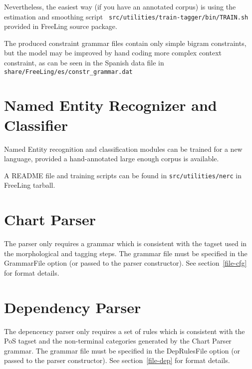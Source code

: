 \documentclass[a4paper]{book}
\begin{document}
   Nevertheless, the easiest way (if you have an annotated corpus) is
   using the estimation and smoothing script {\tt
   src/utilities/train-tagger/bin/TRAIN.sh} provided in FreeLing source package.  

   The produced constraint grammar files contain only simple bigram
   constraints, but the model may be improved by hand coding more
   complex context constraint, as can be seen in the Spanish data file
   in {\tt share/FreeLing/es/constr\_grammar.dat}

  \section{Named Entity Recognizer and Classifier}
 
  Named Entity recognition and classification modules can be trained
  for a new language, provided a hand-annotated large enough corpus is
  available.

  A README file and training scripts can be found in 
  {\tt src/utilities/nerc} in FreeLing tarball.

  \section{Chart Parser}

   The parser only requires a grammar which is consistent with the
   tagset used in the morphological and tagging steps.
   The grammar file must be specified in the GrammarFile option
   (or passed to the parser constructor). See section~\ref{file-cfg}
   for format details.

  \section{Dependency Parser}

   The depencency parser only requires a set of rules which is consistent with the
   PoS tagset and the non-terminal categories generated by the Chart
   Parser grammar.
   The grammar file must be specified in the DepRulesFile option
   (or passed to the parser constructor). See section~\ref{file-dep}
   for format details.


 
\end{document}
